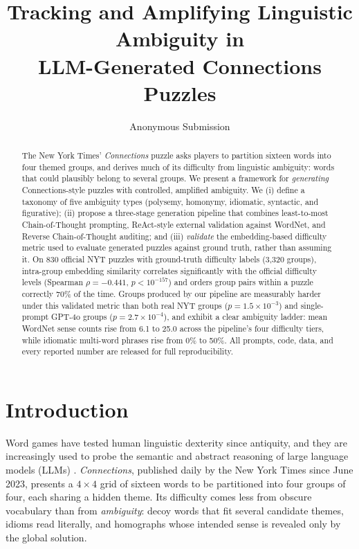\documentclass[11pt]{article}
\title{Tracking and Amplifying Linguistic Ambiguity in\\ LLM-Generated Connections Puzzles}
\author{Anonymous Submission}
\begin{document}
\maketitle

\begin{abstract}
The New York Times' \emph{Connections} puzzle asks players to partition sixteen words into four themed groups, and derives much of its difficulty from linguistic ambiguity: words that could plausibly belong to several groups. We present a framework for \emph{generating} Connections-style puzzles with controlled, amplified ambiguity. We (i) define a taxonomy of five ambiguity types (polysemy, homonymy, idiomatic, syntactic, and figurative); (ii) propose a three-stage generation pipeline that combines least-to-most Chain-of-Thought prompting, ReAct-style external validation against WordNet, and Reverse Chain-of-Thought auditing; and (iii) \emph{validate} the embedding-based difficulty metric used to evaluate generated puzzles against ground truth, rather than assuming it. On 830 official NYT puzzles with ground-truth difficulty labels (3,320 groups), intra-group embedding similarity correlates significantly with the official difficulty levels (Spearman $\rho = -0.441$, $p < 10^{-157}$) and orders group pairs within a puzzle correctly 70\% of the time. Groups produced by our pipeline are measurably harder under this validated metric than both real NYT groups ($p = 1.5\times10^{-3}$) and single-prompt GPT-4o groups ($p = 2.7\times10^{-4}$), and exhibit a clear ambiguity ladder: mean WordNet sense counts rise from 6.1 to 25.0 across the pipeline's four difficulty tiers, while idiomatic multi-word phrases rise from 0\% to 50\%. All prompts, code, data, and every reported number are released for full reproducibility.
\end{abstract}

\section{Introduction}

Word games have tested human linguistic dexterity since antiquity, and they are increasingly used to probe the semantic and abstract reasoning of large language models (LLMs) \citep{todd2024missed, samadarshi2024connecting}. \emph{Connections}, published daily by the New York Times since June 2023, presents a $4\times4$ grid of sixteen words to be partitioned into four groups of four, each sharing a hidden theme. Its difficulty comes less from obscure vocabulary than from \emph{ambiguity}: decoy words that fit several candidate themes, idioms read literally, and homographs whose intended sense is revealed only by the global solution.
\end{document}
